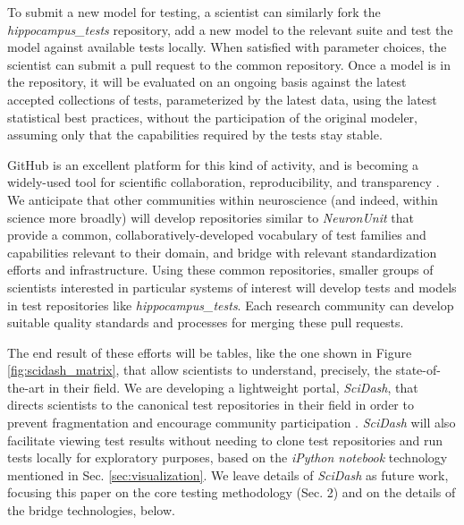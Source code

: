 \documentclass{frontiersSCNS}
\begin{document}
To submit a new model for testing, a scientist can similarly fork the \textit{hippocampus\_tests} repository, add a new model to the relevant suite and test the model against available tests locally. 
When satisfied with parameter choices, the scientist can submit a pull request to the common repository. 
Once a model is in the repository, it will be evaluated on an ongoing basis against the latest accepted collections of tests, parameterized by the latest data, using the latest statistical best practices, without the participation of the original modeler, assuming only that the capabilities required by the tests stay stable.  

GitHub is an excellent platform for this kind of activity, and is becoming a widely-used tool for scientific collaboration, reproducibility, and transparency \citep{ram_git_2013}.  
We anticipate that other communities within neuroscience (and indeed, within science more broadly) will develop repositories similar to \textit{NeuronUnit} that provide a common, collaboratively-developed vocabulary of test families and capabilities relevant to their domain, and bridge with relevant standardization efforts and infrastructure. 
Using these common repositories, smaller groups of scientists interested in particular systems of interest will develop tests and models in test repositories like \textit{hippocampus\_tests}. 
Each research community can develop suitable quality standards and processes for merging these pull requests. 

The end result of these efforts will be tables, like the one shown in Figure \ref{fig:scidash_matrix}, that allow scientists to understand, precisely, the state-of-the-art in their field. 
We are developing a lightweight portal, \textit{SciDash}, that directs scientists to the canonical test repositories in their field in order to prevent fragmentation and encourage community participation \citep{omar_sciunit_2013}. 
\textit{SciDash} will also facilitate viewing test results without needing to clone test repositories and run tests locally for exploratory purposes, based on the \textit{iPython notebook} technology mentioned in Sec. \ref{sec:visualization}. 
We leave details of \textit{SciDash} as future work, focusing this paper on the core testing methodology (Sec. 2) and on the details of the bridge technologies, below.
\end{document}
